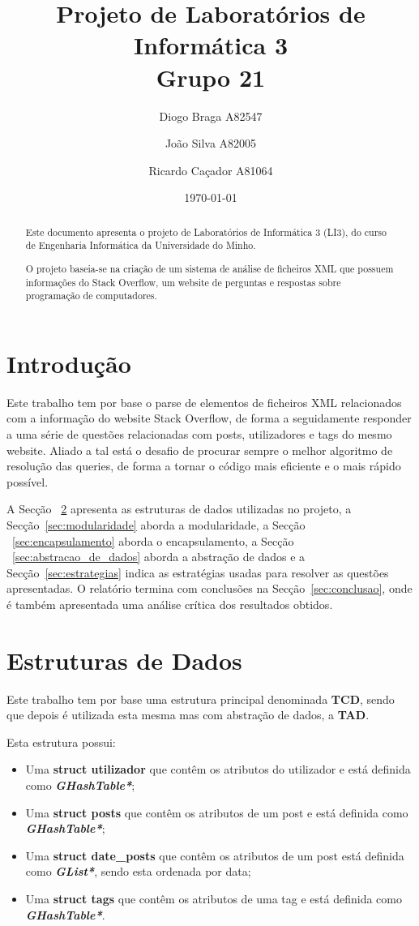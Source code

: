 \documentclass[a4paper]{article}
\title{Projeto de Laboratórios de Informática 3\\Grupo 21}
\author{Diogo Braga A82547 \and João Silva A82005 \and Ricardo Caçador A81064}
\date{\today}
\begin{document}
\maketitle

\begin{abstract}
Este documento apresenta o projeto de Laboratórios de Informática
3 (LI3), do curso de Engenharia Informática da Universidade
do Minho.

O projeto baseia-se na criação de um sistema de análise de ficheiros 
XML que possuem informações do Stack Overflow, um website de perguntas
e respostas sobre programação de computadores.

\end{abstract}

\tableofcontents
\listoffigures

\section{Introdução}
\label{sec:intro}

Este trabalho tem por base o parse de elementos de ficheiros XML
relacionados com a informação do website Stack Overflow, de forma
a seguidamente responder a uma série de questões relacionadas com
posts, utilizadores e tags do mesmo website. Aliado a tal está o desafio
de procurar sempre o melhor algoritmo de resolução das queries, de 
forma a tornar o código mais eficiente e o mais rápido possível.

A Secção ~\ref{sec:estruturas} apresenta as estruturas de dados utilizadas 
no projeto, a Secção~\ref{sec:modularidade} aborda a modularidade, 
a Secção ~\ref{sec:encapsulamento} aborda o encapsulamento, a 
Secção ~\ref{sec:abstracao_de_dados} aborda a abstração de dados e a 
Secção~\ref{sec:estrategias} indica as estratégias usadas para resolver 
as questões apresentadas. O relatório termina com conclusões na
Secção~\ref{sec:conclusao}, onde é também apresentada uma análise
crítica dos resultados obtidos.

\section{Estruturas de Dados}
\label{sec:estruturas}

Este trabalho tem por base uma estrutura principal denominada \textbf{TCD}, 
sendo que depois é utilizada esta mesma mas com abstração de dados, a 
\textbf{TAD}.

Esta estrutura possui:
\begin{itemize}
	\item Uma \textbf{struct utilizador} que contêm os atributos do utilizador
e está definida como \textit{\textbf{GHashTable*}};
	\item Uma \textbf{struct posts} que contêm os atributos de um post e
está definida como \textit{\textbf{GHashTable*}};
	\item Uma \textbf{struct date\_posts} que contêm os atributos de um post
está definida como \textit{\textbf{GList*}}, sendo esta ordenada por data;
	\item Uma \textbf{struct tags} que contêm os atributos de uma tag e
está definida como \textit{\textbf{GHashTable*}}.
\end{itemize}
\end{document}
